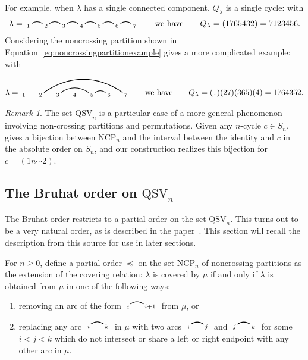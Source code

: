 \documentclass[12pt]{article}
\theoremstyle{definition}
\theoremstyle{remark}
\newtheorem{rem}[equation]{Remark}
\numberwithin{equation}{section}
\newcommand{\QSV}{\mathrm{QSV}}
\newcommand{\NCP}{\mathrm{NCP}}
\newcommand{\edge}[2]{\tikz[scale = 0.75, baseline = -0.2cm]{
\draw (0.1, 0) node[inner sep = 0ex] (a) {};
\node[left, xshift = 0.1cm, yshift = -0.1cm] at (a) {$\scriptstyle #1$};
\draw (0.9, 0)  node[inner sep = 0ex] (b) {};
\node[right, xshift = -0.1cm, yshift = -0.1cm] at (b) {$\scriptstyle #2$};
\draw[thick] (a) to[out = 35, in = 145] (b);}}
\begin{document}
For example, when $\lambda$ has a single connected component, $Q_{\lambda}$ is a single cycle: with
\[
\lambda = \begin{tikzpicture}[scale = 0.75, baseline = 0.75*-0.2]
\foreach \x in {1, ..., 7}{\draw[fill] (\x - 1, 0) node[inner sep = 2pt] (\x) {$\scriptstyle \x$};}
\foreach \i\j in {1/2, 2/3, 3/4, 4/5, 5/6, 6/7}{\draw[thick] (\i) to[out = 35, in = 145] (\j);}
\end{tikzpicture}
\qquad\text{we have}\qquad
Q_{\lambda} = (1765432) = 7123456.
\]
Considering the noncrossing partition shown in Equation~\eqref{eq:noncrossingpartitionexample} gives a more complicated example: with
\[
\lambda = \begin{tikzpicture}[scale = 0.75, baseline = 0.75*-0.2]
\foreach \x in {1, ..., 7}{\draw[fill] (\x - 1, 0) node[inner sep = 2pt] (\x) {$\scriptstyle \x$};}
\foreach \i\j in {5/6, 3/5,2/7}{\draw[thick] (\i) to[out = 35, in = 145] (\j);}
\end{tikzpicture}
\qquad\text{we have}\qquad
Q_{\lambda} = (1)(27)(365)(4) = 1764352.
\]

\begin{rem}
\label{rem:QSVnoncrossing}
The set $\QSV_{n}$ is a particular case of a more general phenomenon involving non-crossing partitions and permutations.  
Given any $n$-cycle $c \in S_{n}$,~\cite{Baine} gives a bijection between $\NCP_{n}$ and the interval between the identity and $c$ in the absolute order on $S_{n}$, and our construction realizes this bijection for $c = (1n\cdots 2)$.  
\end{rem}

\subsection{The Bruhat order on $\QSV_{n}$}
\label{sec:bruhatballot}

The Bruhat order restricts to a partial order on the set $\QSV_{n}$.
This turns out to be a very natural order, as is described in the paper~\cite{GobetWilliams}.  
This section will recall the description from this source for use in later sections.

For $n \ge 0$, define a partial order $\preceq$ on the set $\NCP_{n}$ of noncrossing partitions as the extension of the covering relation: $\lambda$ is covered by $\mu$ if and only if $\lambda$ is obtained from $\mu$ in one of the following ways:
\begin{enumerate}
\item removing an arc of the form $ \edge{i}{i+1}$ from $\mu$, or

\item replacing any arc $ \edge{i}{k}$ in $\mu$ with two arcs $ \edge{i}{j}$ and $ \edge{j}{k}$ for some $i < j < k$ which do not intersect or share a left or right endpoint with any other arc in $\mu$.

\end{enumerate}
\end{document}
